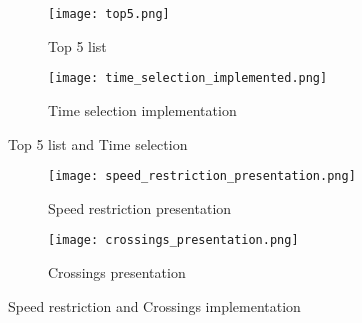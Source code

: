 \begin{figure}[h!tbp]
	\centering
	\begin{subfigure}{0.4\textwidth}
		\texttt{[image: top5.png]}
		\caption[Top 5 list]{Top 5 list}
		\label{fig:top_5_list}
	\end{subfigure}
	\begin{subfigure}{0.6\textwidth}
		\texttt{[image: time\_selection\_implemented.png]}
		\caption[Time selection implementation]{Time selection implementation}
		\label{fig:time_selection_implemented}
	\end{subfigure}
	\caption[Top 5 list and Time selection]{Top 5 list and Time selection}
	\label{fig:Top5_list_and_time_selection}
\end{figure}

\begin{figure}[h!tbp]
	\centering
	\begin{subfigure}{0.6\textwidth}
		\texttt{[image: speed\_restriction\_presentation.png]}
		\caption[Speed restriction presentation]{Speed restriction presentation}
		\label{fig:speed_restriction_presentation}
	\end{subfigure}
	\begin{subfigure}{0.25\textwidth}
		\texttt{[image: crossings\_presentation.png]}
		\caption[Crossings presentation]{Crossings presentation}
		\label{fig:crossings_presentation}
	\end{subfigure}
	\caption[Speed restriction and Crossings implementation]{Speed restriction and Crossings implementation}
	\label{fig:crossings_and_speed_restriction_implementation}
\end{figure}

